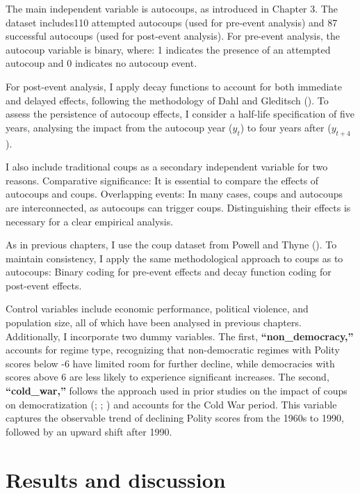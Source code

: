 \documentclass[
  12pt,
]{report}
\begin{document}
The main independent variable is autocoups, as introduced in Chapter 3.
The dataset includes110 attempted autocoups (used for pre-event
analysis) and 87 successful autocoups (used for post-event analysis).
For pre-event analysis, the autocoup variable is binary, where: 1
indicates the presence of an attempted autocoup and 0 indicates no
autocoup event.

For post-event analysis, I apply decay functions to account for both
immediate and delayed effects, following the methodology of Dahl and
Gleditsch (). To assess the persistence of
autocoup effects, I consider a half-life specification of five years,
analysing the impact from the autocoup year (\(y_t\)) to four years
after (\(y_{t+4}\)).

I also include traditional coups as a secondary independent variable for
two reasons. Comparative significance: It is essential to compare the
effects of autocoups and coups. Overlapping events: In many cases, coups
and autocoups are interconnected, as autocoups can trigger coups.
Distinguishing their effects is necessary for a clear empirical
analysis.

As in previous chapters, I use the coup dataset from Powell and Thyne
(). To maintain consistency, I apply the
same methodological approach to coups as to autocoups: Binary coding for
pre-event effects and decay function coding for post-event effects.

Control variables include economic performance, political violence, and
population size, all of which have been analysed in previous chapters.
Additionally, I incorporate two dummy variables. The first,
\textbf{``\textbf{non\_democracy},''} accounts for regime type,
recognizing that non-democratic regimes with Polity scores below -6 have
limited room for further decline, while democracies with scores above 6
are less likely to experience significant increases. The second,
\textbf{``\textbf{cold\_war},''} follows the approach used in prior
studies on the impact of coups on democratization
(;
;
) and accounts for the
Cold War period. This variable captures the observable trend of
declining Polity scores from the 1960s to 1990, followed by an upward
shift after 1990.

\section{Results and discussion}\label{results-and-discussion-1}
\end{document}
